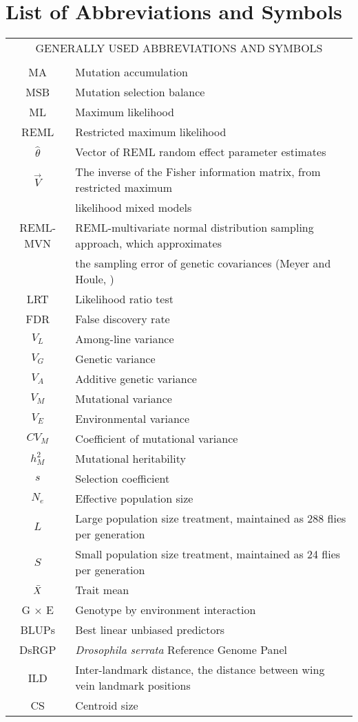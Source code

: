 \chapter{List of Abbreviations and Symbols}

\begin{table}[htp]
\begin{center}
\renewcommand{\arraystretch}{1.3} %
\begin{tabular}{cl}
\multicolumn{2}{c}{\MakeUppercase{Generally used Abbreviations and Symbols}}\\
&\\
MA & Mutation accumulation\\
MSB & Mutation selection balance\\
ML & Maximum likelihood \\
REML & Restricted maximum likelihood \\
$\hat\theta$ & Vector of REML random effect parameter estimates\\
$\vec{V}$ & The inverse of the Fisher information matrix, from restricted maximum \\[-0.8ex]
& likelihood mixed models\\
REML-MVN & REML-multivariate normal distribution sampling approach, which approximates\\[-0.8ex]
& the sampling error of genetic covariances (Meyer and Houle, \citeyear{Meye13,Houl15})\\
LRT & Likelihood ratio test \\
FDR & False discovery rate \\
$V_L$ &  Among-line variance\\
$V_G$ &  Genetic variance\\
$V_A$ &  Additive genetic variance\\
$V_M$ &  Mutational variance \\
$V_E$ &  Environmental variance\\
$CV_M$ & Coefficient of mutational variance\\
$h_M^2$ & Mutational heritability\\
$s$ & Selection coefficient\\
$N_e$ & Effective population size\\
$L$ & Large population size treatment, maintained as 288 flies per generation\\
$S$ & Small population size treatment, maintained as 24 flies per generation\\
$\Bar{X}$ & Trait mean \\
G $\times$ E & Genotype by environment interaction \\
BLUPs & Best linear unbiased predictors \\
DsRGP & \textit{Drosophila serrata} Reference Genome Panel \\
ILD & Inter-landmark distance, the distance between wing vein landmark positions\\
CS & Centroid size\\

\end{tabular}
\end{center}
\end{table}
